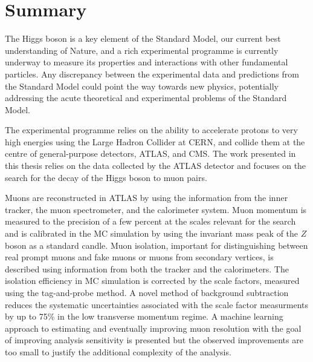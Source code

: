 \chapter*{Summary}

The Higgs boson is a key element of the Standard Model,
our current best understanding of Nature, and a rich experimental
programme is currently underway to measure its properties
and interactions with other fundamental particles. Any
discrepancy between the experimental data and predictions
from the Standard Model could point the way towards new
physics, potentially addressing the acute theoretical
and experimental problems of the Standard Model.

The experimental programme relies on the ability to
accelerate protons to very high energies using the Large
Hadron Collider at CERN, and collide them at the centre of
general-purpose detectors, ATLAS, and CMS. The work presented
in this thesis relies on the data collected by the ATLAS
detector and focuses on the search for the decay of the
Higgs boson to muon pairs.

Muons are reconstructed in ATLAS by using the information
from the inner tracker, the muon spectrometer, and the
calorimeter system. Muon momentum is measured to the
precision of a few percent at the scales relevant for
the search and is calibrated in the MC simulation by using
the invariant mass peak of the $Z$ boson as a standard
candle. Muon isolation, important for distinguishing
between real prompt muons and fake muons or muons from
secondary vertices, is described using information from
both the tracker and the calorimeters. The isolation
efficiency in MC simulation is corrected by the scale
factors, measured using the tag-and-probe method. A
novel method of background subtraction reduces the
systematic uncertainties associated with the
scale factor measurments by up to 75\% in the low transverse
momentum regime. A machine learning approach to
estimating and eventually improving muon resolution
with the goal of improving analysis sensitivity is
presented but the observed improvements are too small
to justify the additional complexity of the analysis.


